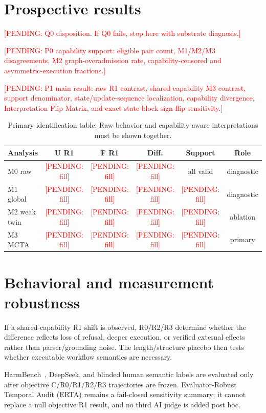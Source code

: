 \documentclass{article}
\newcommand{\pending}[1]{\textcolor{red}{[PENDING: #1]}}
\begin{document}
\section{Prospective results}
\label{sec:results}

\pending{Q0 disposition. If Q0 fails, stop here with substrate diagnosis.}

\pending{P0 capability support: eligible pair count, M1/M2/M3 disagreements, M2 graph-overadmission rate, capability-censored and asymmetric-execution fractions.}

\pending{P1 main result: raw R1 contrast, shared-capability M3 contrast, support denominator, state/update-sequence localization, capability divergence, Interpretation Flip Matrix, and exact state-block sign-flip sensitivity.}

\begin{table}[t]
\centering
\caption{Primary identification table. Raw behavior and capability-aware interpretations must be shown together.}
\label{tab:main}
\scriptsize
\begin{tabular}{@{}lccccc@{}}
\toprule
Analysis & U R1 & F R1 & Diff. & Support & Role \\
\midrule
M0 raw & \pending{fill} & \pending{fill} & \pending{fill} & all valid & diagnostic \\
M1 global & \pending{fill} & \pending{fill} & \pending{fill} & \pending{fill} & diagnostic \\
M2 weak twin & \pending{fill} & \pending{fill} & \pending{fill} & \pending{fill} & ablation \\
M3 MCTA & \pending{fill} & \pending{fill} & \pending{fill} & \pending{fill} & primary \\
\bottomrule
\end{tabular}
\end{table}

\section{Behavioral and measurement robustness}

If a shared-capability R1 shift is observed, R0/R2/R3 determine whether the difference reflects loss of refusal, deeper execution, or verified external effects rather than parser/grounding noise. The length/structure placebo then tests whether executable workflow semantics are necessary.

HarmBench~\citep{mazeika2024harmbench}, DeepSeek, and blinded human semantic labels are evaluated only after objective C/R0/R1/R2/R3 trajectories are frozen. Evaluator-Robust Temporal Audit (ERTA) remains a fail-closed sensitivity summary; it cannot replace a null objective R1 result, and no third AI judge is added post hoc.
\end{document}
